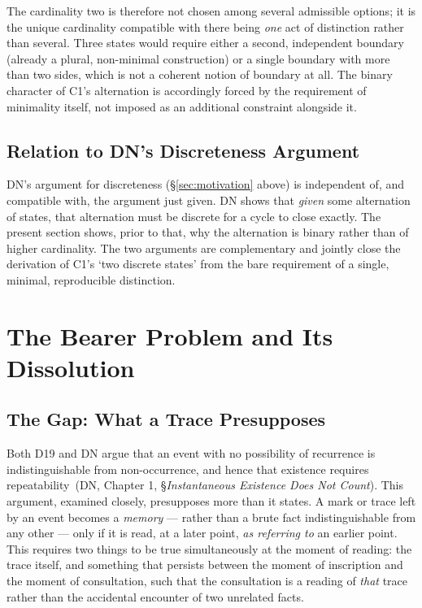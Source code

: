 \documentclass[11pt,a4paper]{article}
\begin{document}
\begin{resolutionbox}
The cardinality two is therefore not chosen among several admissible options; it is the unique cardinality compatible with there being \emph{one} act of distinction rather than several. Three states would require either a second, independent boundary (already a plural, non-minimal construction) or a single boundary with more than two sides, which is not a coherent notion of boundary at all. The binary character of C1's alternation is accordingly forced by the requirement of minimality itself, not imposed as an additional constraint alongside it.
\end{resolutionbox}

\subsection{Relation to DN's Discreteness Argument}

DN's argument for discreteness (\S\ref{sec:motivation} above) is independent of, and compatible with, the argument just given. DN shows that \emph{given} some alternation of states, that alternation must be discrete for a cycle to close exactly. The present section shows, prior to that, why the alternation is binary rather than of higher cardinality. The two arguments are complementary and jointly close the derivation of C1's `two discrete states' from the bare requirement of a single, minimal, reproducible distinction.

\section{The Bearer Problem and Its Dissolution}
\label{sec:bearer}

\subsection{The Gap: What a Trace Presupposes}

Both D19 and DN argue that an event with no possibility of recurrence is indistinguishable from non-occurrence, and hence that existence requires repeatability~\citep[\S 2]{D19}(DN, Chapter 1, \S \emph{Instantaneous Existence Does Not Count}). This argument, examined closely, presupposes more than it states. A mark or trace left by an event becomes a \emph{memory} --- rather than a brute fact indistinguishable from any other --- only if it is read, at a later point, \emph{as referring to} an earlier point. This requires two things to be true simultaneously at the moment of reading: the trace itself, and something that persists between the moment of inscription and the moment of consultation, such that the consultation is a reading of \emph{that} trace rather than the accidental encounter of two unrelated facts.
\end{document}
